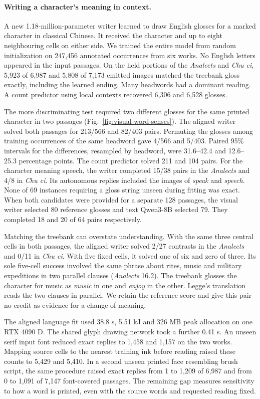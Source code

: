 \paragraph{Writing a character's meaning in context.}
A new 1.18-million-parameter writer learned to draw English glosses for a marked character in classical Chinese. It received the character and up to eight neighbouring cells on either side. We trained the entire model from random initialization on 247,456 annotated occurrences from six works. No English letters appeared in the input passages. On the held portions of the \textit{Analects} and \textit{Chu ci}, 5,923 of 6,987 and 5,808 of 7,173 emitted images matched the treebank gloss exactly, including the learned ending. Many headwords had a dominant reading. A count predictor using local contexts recovered 6,306 and 6,528 glosses.

The more discriminating test required two different glosses for the same printed character in two passages (Fig.~\ref{fig:visual-word-senses}). The aligned writer solved both passages for 213/566 and 82/403 pairs. Permuting the glosses among training occurrences of the same headword gave 4/566 and 5/403. Paired 95\% intervals for the differences, resampled by headword, were 31.6--42.4 and 12.6--25.3 percentage points. The count predictor solved 211 and 104 pairs. For the character meaning speech, the writer completed 15/38 pairs in the \textit{Analects} and 4/8 in \textit{Chu ci}. Its autonomous replies included the images of \textit{speak} and \textit{speech}. None of 69 instances requiring a gloss string unseen during fitting was exact. When both candidates were provided for a separate 128 passages, the visual writer selected 80 reference glosses and text Qwen3-8B selected 79. They completed 18 and 20 of 64 pairs respectively.

Matching the treebank can overstate understanding. With the same three central cells in both passages, the aligned writer solved 2/27 contrasts in the \textit{Analects} and 0/11 in \textit{Chu ci}. With five fixed cells, it solved one of six and zero of three. Its sole five-cell success involved the same phrase about rites, music and military expeditions in two parallel clauses (\textit{Analects} 16.2). The treebank glosses the character for music as \textit{music} in one and \textit{enjoy} in the other. Legge's translation reads the two clauses in parallel. We retain the reference score and give this pair no credit as evidence for a change of meaning.

The aligned language fit used 38.8 s, 5.51 kJ and 326 MB peak allocation on one RTX 4090 D. The shared glyph drawing network took a further 0.41 s. An unseen serif input font reduced exact replies to 1,458 and 1,157 on the two works. Mapping source cells to the nearest training ink before reading raised these counts to 5,429 and 5,410. In a second unseen printed face resembling brush script, the same procedure raised exact replies from 1 to 1,209 of 6,987 and from 0 to 1,091 of 7,147 font-covered passages. The remaining gap measures sensitivity to how a word is printed, even with the source words and requested reading fixed.
